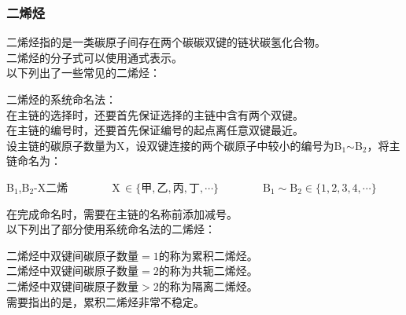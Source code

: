 \documentclass[UTF8]{ctexart}
\begin{document}
\subsubsection{二烯烃}
    二烯烃指的是一类碳原子间存在两个碳碳双键的链状碳氢化合物。\\[3mm]
    二烯烃的分子式可以使用通式表示。\\[5mm]
    以下列出了一些常见的二烯烃：\vspace{5pt}
    \begin{center}
        \qquad\qquad
    \end{center}\vspace{10pt}
    二烯烃的系统命名法：\\[3mm]
    在主链的选择时，还要首先保证选择的主链中含有两个双键。\\[3mm]
    在主链的编号时，还要首先保证编号的起点离任意双键最近。\\[3mm]
    设主链的碳原子数量为X，设双键连接的两个碳原子中较小的编号为B$_1$$\sim$B$_2$，将主链命名为：
    \begin{center}
        B$_1$,B$_2$-X二烯~~~~~~~~X\,$\in\big\{\text{甲},\text{乙},\text{丙},\text{丁},\cdots\big\}$~~~~~~~~$\text{B}_1\sim\text{B}_2\in\big\{1,2,3,4,\cdots\big\}$\\[5mm]
    \end{center}
    在完成命名时，需要在主链的名称前添加减号。\\[5mm]
    以下列出了部分使用系统命名法的二烯烃：\vspace{5pt}
    \begin{center}
        \qquad\quad
        \qquad\quad
    \end{center}\vspace{15pt}
    二烯烃中双键间碳原子数量$=1$的称为累积二烯烃。\\[3mm]
    二烯烃中双键间碳原子数量$=2$的称为共轭二烯烃。\\[3mm]
    二烯烃中双键间碳原子数量$>2$的称为隔离二烯烃。\\[3mm]
    需要指出的是，累积二烯烃非常不稳定。
\end{document}
